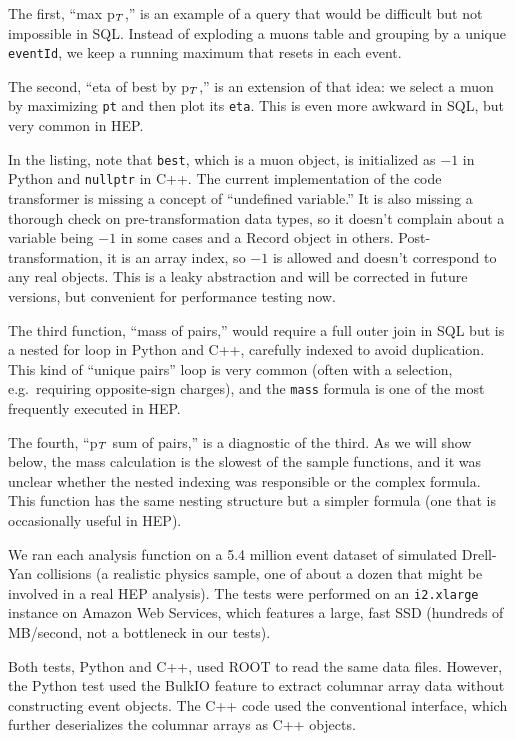 \documentclass[10pt, conference, compsocconf]{IEEEtran}
\begin{document}
The first, ``max p$_{\mbox{\scriptsize T}}$,'' is an example of a query that would be difficult but not impossible in SQL. Instead of exploding a muons table and grouping by a unique {\tt eventId}, we keep a running maximum that resets in each event.

The second, ``eta of best by p$_{\mbox{\scriptsize T}}$,'' is an extension of that idea: we select a muon by maximizing {\tt pt} and then plot its {\tt eta}. This is even more awkward in SQL, but very common in HEP.

In the listing, note that {\tt best}, which is a muon object, is initialized as $-1$ in Python and {\tt nullptr} in C++. The current implementation of the code transformer is missing a concept of ``undefined variable.'' It is also missing a thorough check on pre-transformation data types, so it doesn't complain about a variable being $-1$ in some cases and a Record object in others. Post-transformation, it is an array index, so $-1$ is allowed and doesn't correspond to any real objects. This is a leaky abstraction and will be corrected in future versions, but convenient for performance testing now.

The third function, ``mass of pairs,'' would require a full outer join in SQL but is a nested for loop in Python and C++, carefully indexed to avoid duplication. This kind of ``unique pairs'' loop is very common (often with a selection, e.g.\ requiring opposite-sign charges), and the {\tt mass} formula is one of the most frequently executed in HEP.

The fourth, ``p$_{\mbox{\scriptsize T}}$ sum of pairs,'' is a diagnostic of the third. As we will show below, the mass calculation is the slowest of the sample functions, and it was unclear whether the nested indexing was responsible or the complex formula. This function has the same nesting structure but a simpler formula (one that is occasionally useful in HEP).

We ran each analysis function on a 5.4 million event dataset of simulated Drell-Yan collisions (a realistic physics sample, one of about a dozen that might be involved in a real HEP analysis). The tests were performed on an {\tt i2.xlarge} instance on Amazon Web Services, which features a large, fast SSD (hundreds of MB/second, not a bottleneck in our tests).

Both tests, Python and C++, used ROOT to read the same data files. However, the Python test used the BulkIO feature to extract columnar array data without constructing event objects. The C++ code used the conventional interface, which further deserializes the columnar arrays as C++ objects.
\end{document}

